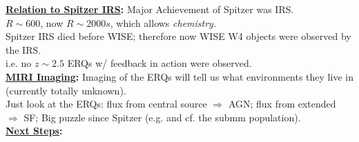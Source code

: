 \medskip
\medskip
\smallskip
\smallskip
\noindent
{\bf \underline{Relation to Spitzer IRS}:}
Major Achievement of Spitzer was IRS. \\
$R\sim600$, now $R\sim2000s$, which allows {\it chemistry.}\\
Spitzer IRS died before WISE; therefore now WISE W4 objects were observed by the IRS.\\
i.e. no $z\sim2.5$ ERQs w/ feedback in action were observed. \\




\medskip
\medskip
\smallskip
\smallskip
\noindent
{\bf \underline{MIRI Imaging}:}
Imaging of the ERQs will tell us what environments they live in (currently totally unknown).\\
Just look at the ERQs: flux from central source $\Rightarrow$ AGN; flux from extended 
$\Rightarrow$ SF; Big puzzle since Spitzer (e.g. and cf. the submm population). \\



\medskip
\medskip
\smallskip
\smallskip
\noindent
{\bf \underline{Next Steps}:}
